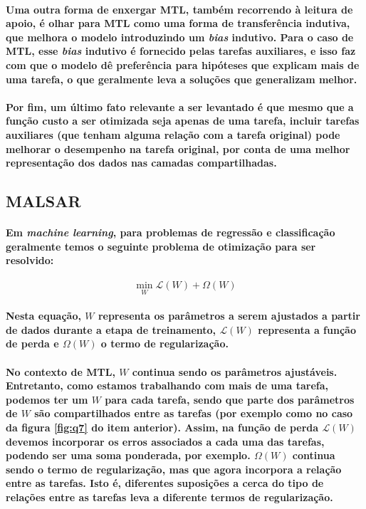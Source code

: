 \documentclass[a4paper]{article}    %
\begin{document}
\paragraph{Uma outra forma de enxergar MTL, também recorrendo à leitura de apoio, é olhar para MTL como uma forma de transferência indutiva, que melhora o modelo introduzindo um \emph{bias} indutivo. Para o caso de MTL, esse \emph{bias} indutivo é fornecido pelas tarefas auxiliares, e isso faz com que o modelo dê preferência para hipóteses que explicam mais de uma tarefa, o que geralmente leva a soluções que generalizam melhor.}

\paragraph{Por fim, um último fato relevante a ser levantado é que mesmo que a função custo a ser otimizada seja apenas de uma tarefa, incluir tarefas auxiliares (que tenham alguma relação com a tarefa original) pode melhorar o desempenho na tarefa original, por conta de uma melhor representação dos dados nas camadas compartilhadas.}

\subsection{MALSAR}
\paragraph{Em \emph{machine learning}, para problemas de regressão e classificação geralmente temos o seguinte problema de otimização para ser resolvido:}

\[\min_W \mathcal{L}(W) + \Omega(W)\]

\paragraph{Nesta equação, $W$ representa os parâmetros a serem ajustados a partir de dados durante a etapa de treinamento, $\mathcal{L}(W)$ representa a função de perda e $\Omega(W)$ o termo de regularização.}

\paragraph{No contexto de MTL, $W$ continua sendo os parâmetros ajustáveis. Entretanto, como estamos trabalhando com mais de uma tarefa, podemos ter um $W$ para cada tarefa, sendo que parte dos parâmetros de $W$ são compartilhados entre as tarefas (por exemplo como no caso da figura \ref{fig:q7} do item anterior). Assim, na função de perda $\mathcal{L}(W)$ devemos incorporar os erros associados a cada uma das tarefas, podendo ser uma soma ponderada, por exemplo. $\Omega(W)$ continua sendo o termo de regularização, mas que agora incorpora a relação entre as tarefas. Isto é, diferentes suposições a cerca do tipo de relações entre as tarefas leva a diferente termos de regularização.}
\end{document}
